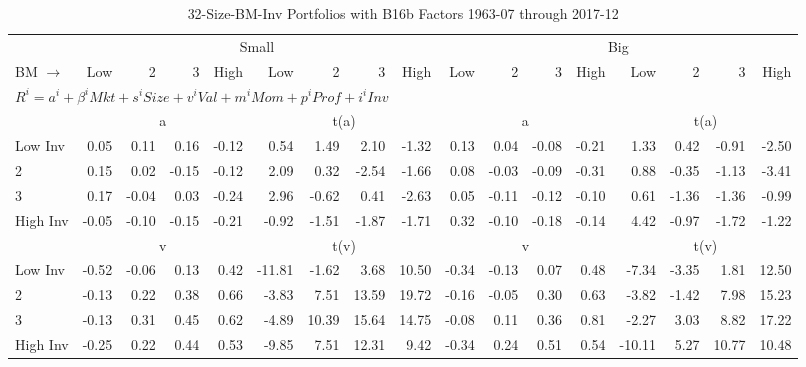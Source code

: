 
\begin{table}[!ht]
\footnotesize
\centering
\caption{32-Size-BM-Inv Portfolios with B16b Factors 1963-07 through 2017-12}
\begin{tabular}{lrrrrrrrrrrrrrrrr}
  \toprule
    & \multicolumn{8}{c}{Small} & \multicolumn{8}{c}{Big} \\
      \cmidrule(r){2-9} \cmidrule(r){10-17}
    BM $\rightarrow$ & Low & 2 & 3 & High & Low & 2 & 3 & High & Low & 2 & 3 & High & Low & 2 & 3 & High \\ 
  \midrule
  \multicolumn{17}{l}{$R^i=a^i+\beta^iMkt+s^iSize+v^iVal+m^iMom+p^iProf+i^iInv$} \\

  
    
      & \multicolumn{4}{c}{a} & \multicolumn{4}{c}{t(a)}
    
      & \multicolumn{4}{c}{a} & \multicolumn{4}{c}{t(a)}
    
    \\
      \cmidrule(r){2-5} \cmidrule(r){6-9} \cmidrule(r){10-13} \cmidrule(r){14-17}

    Low Inv   & 0.05  & 0.11  & 0.16  & -0.12  & 0.54  & 1.49  & 2.10  & -1.32  & 0.13  & 0.04  & -0.08  & -0.21  & 1.33  & 0.42  & -0.91  & -2.50  \\
           2  & 0.15  & 0.02  & -0.15  & -0.12  & 2.09  & 0.32  & -2.54  & -1.66  & 0.08  & -0.03  & -0.09  & -0.31  & 0.88  & -0.35  & -1.13  & -3.41  \\
           3  & 0.17  & -0.04  & 0.03  & -0.24  & 2.96  & -0.62  & 0.41  & -2.63  & 0.05  & -0.11  & -0.12  & -0.10  & 0.61  & -1.36  & -1.36  & -0.99  \\
    High Inv  & -0.05  & -0.10  & -0.15  & -0.21  & -0.92  & -1.51  & -1.87  & -1.71  & 0.32  & -0.10  & -0.18  & -0.14  & 4.42  & -0.97  & -1.72  & -1.22  \\

  
    
      & \multicolumn{4}{c}{v} & \multicolumn{4}{c}{t(v)}
    
      & \multicolumn{4}{c}{v} & \multicolumn{4}{c}{t(v)}
    
    \\
      \cmidrule(r){2-5} \cmidrule(r){6-9} \cmidrule(r){10-13} \cmidrule(r){14-17}

    Low Inv   & -0.52  & -0.06  & 0.13  & 0.42  & -11.81  & -1.62  & 3.68  & 10.50  & -0.34  & -0.13  & 0.07  & 0.48  & -7.34  & -3.35  & 1.81  & 12.50  \\
           2  & -0.13  & 0.22  & 0.38  & 0.66  & -3.83  & 7.51  & 13.59  & 19.72  & -0.16  & -0.05  & 0.30  & 0.63  & -3.82  & -1.42  & 7.98  & 15.23  \\
           3  & -0.13  & 0.31  & 0.45  & 0.62  & -4.89  & 10.39  & 15.64  & 14.75  & -0.08  & 0.11  & 0.36  & 0.81  & -2.27  & 3.03  & 8.82  & 17.22  \\
    High Inv  & -0.25  & 0.22  & 0.44  & 0.53  & -9.85  & 7.51  & 12.31  & 9.42  & -0.34  & 0.24  & 0.51  & 0.54  & -10.11  & 5.27  & 10.77  & 10.48  \\


\end{tabular}
\end{table}
